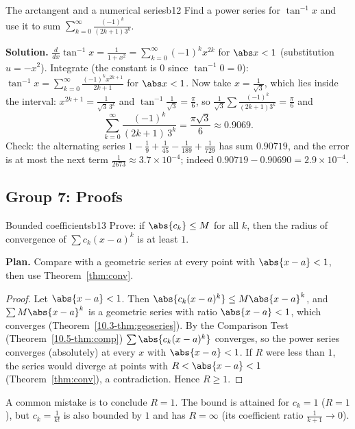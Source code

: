 \documentclass[11pt]{article}
\begin{document}
\begin{exmp}{The arctangent and a numerical series}{b12}
Find a power series for $\tan^{-1}x$ and use it to sum $\displaystyle\sum_{k=0}^\infty\frac{(-1)^k}{(2k+1)3^k}$.

\textbf{Solution.} $\frac d{dx}\tan^{-1}x=\frac1{1+x^2}=\sum_{k=0}^\infty(-1)^kx^{2k}$ for $\abs x<1$ (substitution $u=-x^2$). Integrate (the constant is $0$ since $\tan^{-1}0=0$): $\tan^{-1}x=\sum_{k=0}^\infty\frac{(-1)^kx^{2k+1}}{2k+1}$ for $\abs x<1$. Now take $x=\frac1{\sqrt3}$, which lies inside the interval: $x^{2k+1}=\frac1{\sqrt3\,3^k}$ and $\tan^{-1}\frac1{\sqrt3}=\frac\pi6$, so $\frac1{\sqrt3}\sum\frac{(-1)^k}{(2k+1)3^k}=\frac\pi6$ and
\[
\sum_{k=0}^\infty\frac{(-1)^k}{(2k+1)\,3^k}=\frac{\pi\sqrt3}6\approx0.9069 .
\]
Check: the alternating series $1-\frac19+\frac1{45}-\frac1{189}+\frac1{729}$ has sum $0.90719$, and the error is at most the next term $\frac1{2673}\approx3.7\times10^{-4}$; indeed $0.90719-0.90690=2.9\times10^{-4}$.
\end{exmp}

\subsection*{Group 7: Proofs}

\begin{exmp}{Bounded coefficients}{b13}
Prove: if $\abs{c_k}\le M$ for all $k$, then the radius of convergence of $\sum c_k(x-a)^k$ is at least $1$.

\textbf{Plan.} Compare with a geometric series at every point with $\abs{x-a}<1$, then use Theorem~\ref{thm:conv}.

\begin{proof}
Let $\abs{x-a}<1$. Then $\abs{c_k(x-a)^k}\le M\abs{x-a}^k$, and $\sum M\abs{x-a}^k$ is a geometric series with ratio $\abs{x-a}<1$, which converges (Theorem~\ref{10.3-thm:geoseries}). By the Comparison Test (Theorem~\ref{10.5-thm:comp}) $\sum\abs{c_k(x-a)^k}$ converges, so the power series converges (absolutely) at every $x$ with $\abs{x-a}<1$. If $R$ were less than $1$, the series would diverge at points with $R<\abs{x-a}<1$ (Theorem~\ref{thm:conv}), a contradiction. Hence $R\ge1$.
\end{proof}
A common mistake is to conclude $R=1$. The bound is attained for $c_k=1$ ($R=1$), but $c_k=\frac1{k!}$ is also bounded by $1$ and has $R=\infty$ (its coefficient ratio $\frac1{k+1}\to0$).
\end{exmp}
\end{document}
